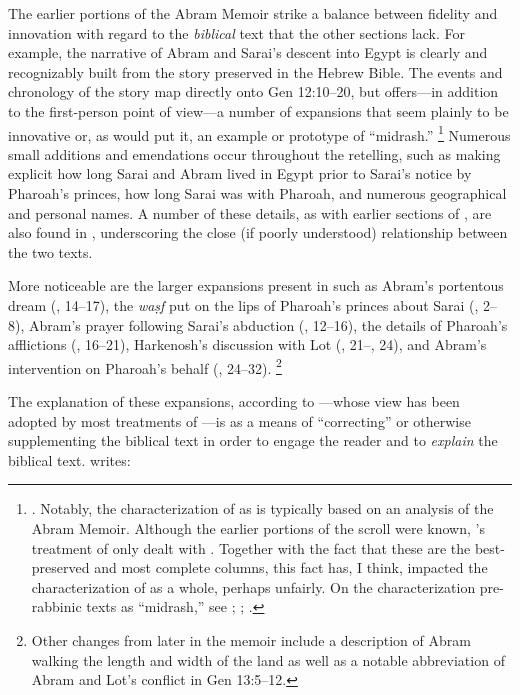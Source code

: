 The earlier portions of the Abram Memoir strike a balance between fidelity and innovation with regard to the \emph{biblical} text that the other sections lack. For example, the narrative of Abram and Sarai's descent into Egypt is clearly and recognizably built from the story preserved in the Hebrew Bible. The events and chronology of the story map directly onto Gen 12:10--20, but \ga offers---in addition to the first-person point of view---a number of expansions that seem plainly to be innovative or, as \vermes would put it, an example or prototype of ``midrash.''%
    \footnote{\Cite[124]{vermes1961}. Notably, the characterization of \ga as \rwb is typically based on an analysis of the Abram Memoir. Although the earlier portions of the scroll were known, \vermes's treatment of \ga only dealt with . Together with the fact that these are the best-preserved and most complete columns, this fact has, I think, impacted the characterization of \ga as a whole, perhaps unfairly. On the characterization pre-rabbinic texts as ``midrash,'' see \cite[esp. 298--305]{mandel2017}; \cite{mandel_dsd2001}; \cite{mandel_bakhos2006}.}
Numerous small additions and emendations occur throughout the retelling, such as making explicit how long Sarai and Abram lived in Egypt prior to Sarai's notice by Pharoah's princes, how long Sarai was with Pharoah, and numerous geographical and personal names. A number of these details, as with earlier sections of \ga, are also found in \jub, underscoring the close (if poorly understood) relationship between the two texts.

More noticeable are the larger expansions present in \ga such as Abram's portentous dream (, 14--17), the \emph{waṣf} put on the lips of Pharoah's princes about Sarai (, 2--8),%
    \autocite{vanderkam_revq1979}
Abram's prayer following Sarai's abduction (, 12--16), the details of Pharoah's afflictions (, 16--21), Harkenosh's discussion with Lot (, 21--, 24), and Abram's intervention on Pharoah's behalf (, 24--32).%
    \footnote{Other changes from later in the memoir include a description of Abram walking the length and width of the land as well as a notable abbreviation of Abram and Lot's conflict in Gen 13:5--12.}

The explanation of these expansions, according to \vermes---whose view has been adopted by most treatments of \ga---is as a means of ``correcting'' or otherwise supplementing the biblical text in order to engage the reader and to \emph{explain} the biblical text.%
    \autocite[126]{vermes1961}
\vermes writes:

